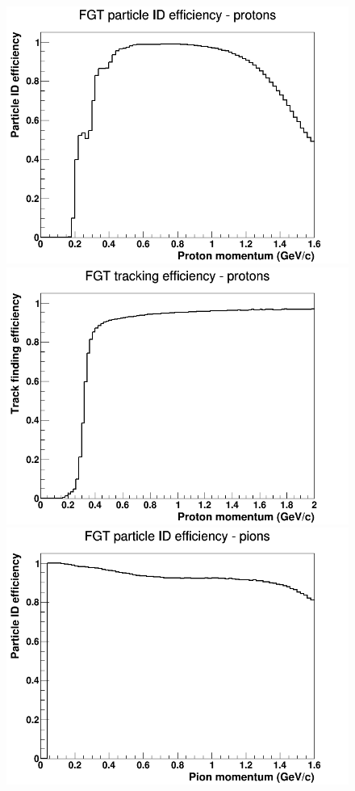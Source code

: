 \begin{figure}[h]
\includegraphics[width=\linewidth]{eff_plots/fgt_pideff_proton.png}
\endminipage
{}
\includegraphics[width=\linewidth]{eff_plots/fgt_trkeff_proton.png}
\endminipage
\newline
{}
\includegraphics[width=\linewidth]{eff_plots/fgt_pideff_pion.png}

\end{figure}
